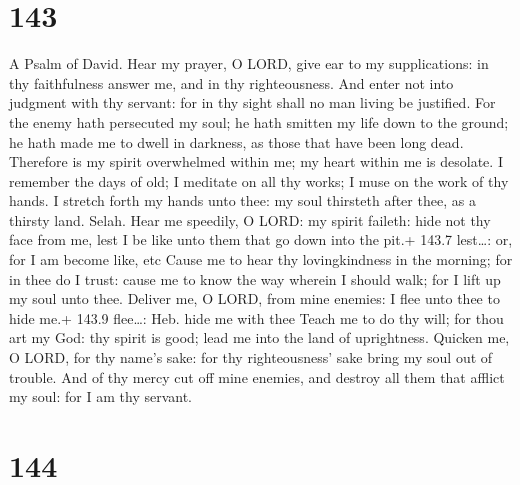 \hypertarget{section-143}{%
\section{143}\label{section-143}}

A Psalm of David.  Hear my prayer, O LORD, give ear to my
supplications: in thy faithfulness answer me, and in thy righteousness.
 And enter not into judgment with thy servant: for in thy
sight shall no man living be justified.  For the enemy hath
persecuted my soul; he hath smitten my life down to the ground; he hath
made me to dwell in darkness, as those that have been long dead.
 Therefore is my spirit overwhelmed within me; my heart
within me is desolate.  I remember the days of old; I
meditate on all thy works; I muse on the work of thy hands. 
I stretch forth my hands unto thee: my soul thirsteth after thee, as a
thirsty land. Selah.  Hear me speedily, O LORD: my spirit
faileth: hide not thy face from me, lest I be like unto them that go
down into the pit.+ 143.7 lest\ldots: or, for I am become like, etc
 Cause me to hear thy lovingkindness in the morning; for in
thee do I trust: cause me to know the way wherein I should walk; for I
lift up my soul unto thee.  Deliver me, O LORD, from mine
enemies: I flee unto thee to hide me.+ 143.9 flee\ldots: Heb. hide me
with thee  Teach me to do thy will; for thou art my God:
thy spirit is good; lead me into the land of uprightness. 
Quicken me, O LORD, for thy name's sake: for thy righteousness' sake
bring my soul out of trouble.  And of thy mercy cut off
mine enemies, and destroy all them that afflict my soul: for I am thy
servant.

\hypertarget{section-144}{%
\section{144}\label{section-144}}

